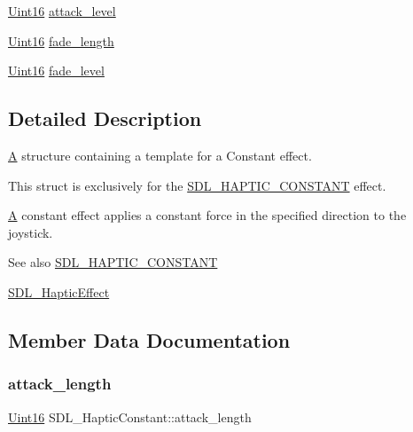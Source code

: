 \begin{DoxyCompactItemize}
\item 
\mbox{\hyperlink{_s_d_l__stdinc_8h_a31fcc0a076c9068668173ee26d33e42b}{Uint16}} \mbox{\hyperlink{struct_s_d_l___haptic_constant_a0928a37f3fab0e5b7daffc7a1d65744c}{attack\+\_\+level}}
\item 
\mbox{\hyperlink{_s_d_l__stdinc_8h_a31fcc0a076c9068668173ee26d33e42b}{Uint16}} \mbox{\hyperlink{struct_s_d_l___haptic_constant_a647a6b761ac6ba16160d0892a12806bc}{fade\+\_\+length}}
\item 
\mbox{\hyperlink{_s_d_l__stdinc_8h_a31fcc0a076c9068668173ee26d33e42b}{Uint16}} \mbox{\hyperlink{struct_s_d_l___haptic_constant_a49f6499c89f3e494efbe92f12277c949}{fade\+\_\+level}}
\end{DoxyCompactItemize}


\subsection{Detailed Description}
\mbox{\hyperlink{struct_a}{A}} structure containing a template for a Constant effect. 

This struct is exclusively for the \mbox{\hyperlink{_s_d_l__haptic_8h_a955fb9f680dcf9cc72a3d5263e85b80a}{S\+D\+L\+\_\+\+H\+A\+P\+T\+I\+C\+\_\+\+C\+O\+N\+S\+T\+A\+NT}} effect.

\mbox{\hyperlink{struct_a}{A}} constant effect applies a constant force in the specified direction to the joystick.

\begin{DoxySeeAlso}{See also}
\mbox{\hyperlink{_s_d_l__haptic_8h_a955fb9f680dcf9cc72a3d5263e85b80a}{S\+D\+L\+\_\+\+H\+A\+P\+T\+I\+C\+\_\+\+C\+O\+N\+S\+T\+A\+NT}} 

\mbox{\hyperlink{union_s_d_l___haptic_effect}{S\+D\+L\+\_\+\+Haptic\+Effect}} 
\end{DoxySeeAlso}


\subsection{Member Data Documentation}
\mbox{\label{struct_s_d_l___haptic_constant_a907bade68ab53fb24e7d2651d19b767f}} 
\subsubsection{\texorpdfstring{attack\_length}{attack\_length}}
{\footnotesize\ttfamily \mbox{\hyperlink{_s_d_l__stdinc_8h_a31fcc0a076c9068668173ee26d33e42b}{Uint16}} S\+D\+L\+\_\+\+Haptic\+Constant\+::attack\+\_\+length}

